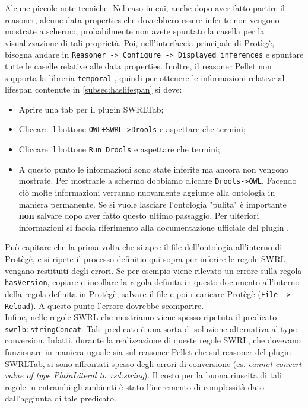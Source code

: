 Alcune piccole note tecniche. Nel caso in cui, anche dopo aver fatto partire il reasoner, alcune data properties che dovrebbero essere inferite non vengono mostrate a schermo, probabilmente non avete spuntato la casella per la visualizzazione di tali proprietà. Poi, nell'interfaccia principale di Protègè, bisogna andare in \texttt{Reasoner -> Configure -> Displayed inferences} e spuntare tutte le caselle relative alle data properties. Inoltre, il reasoner Pellet non supporta la libreria \texttt{temporal} \cite{SWRLTemporalBuiltInsBasic}, quindi per ottenere le informazioni relative al lifespan contenute in \ref{subsec:haslifespan} si deve:
\begin{itemize}
    \item Aprire una tab per il plugin SWRLTab;
    \item Cliccare il bottone \texttt{OWL+SWRL->Drools} e aspettare che termini;
    \item Cliccare il bottone \texttt{Run Drools} e aspettare che termini;
    \item A questo punto le informazioni sono state inferite ma ancora non vengono mostrate. Per mostrarle a schermo dobbiamo cliccare \texttt{Drools->OWL}. Facendo ciò molte informazioni verranno nuovamente aggiunte alla ontologia in maniera permanente. Se si vuole lasciare l'ontologia "pulita" è importante \textbf{non} salvare dopo aver fatto questo ultimo passaggio. Per ulteriori informazioni si faccia riferimento alla documentazione ufficiale del plugin \cite{SWRLTabplugin}.
\end{itemize}
Può capitare che la prima volta che si apre il file dell'ontologia all'interno di Protègè, e si ripete il processo definitio qui sopra per inferire le regole SWRL, vengano restituiti degli errori. Se per esempio viene rilevato un errore sulla regola \texttt{hasVersion}, copiare e incollare la regola definita in questo documento all'interno della regola definita in Protègè, salvare il file e poi ricaricare Protègè (\texttt{File -> Reload}). A questo punto l'errore dovrebbe scomparire.\\

Infine, nelle regole SWRL che mostriamo viene spesso ripetuta il predicato \texttt{swrlb:stringConcat}. Tale predicato è una sorta di soluzione alternativa al type conversion. Infatti, durante la realizzazione di queste regole SWRL, che dovevano funzionare in maniera uguale sia sul reasoner Pellet che sul reasoner del plugin SWRLTab, si sono affrontati spesso degli errori di conversione (es. \textit{cannot convert value of type PlainLiteral to xsd:string}). Il costo per la buona riuscita di tali regole in entrambi gli ambienti è stato l'incremento di complessità dato dall'aggiunta di tale predicato.\\

